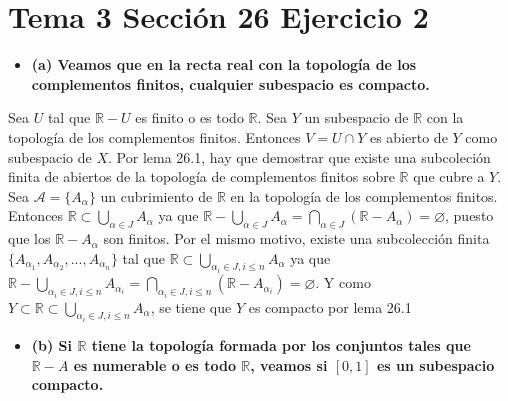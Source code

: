\documentclass{article}
\begin{document}
\section{Tema 3 Sección 26 Ejercicio 2}
\begin{itemize}
\item \bf (a) \rm Veamos que en la recta real con la topología de  los complementos finitos,  cualquier subespacio es compacto.
\end{itemize}
Sea $U$ tal que $\mathbb{R}-U$ es finito o es todo $\mathbb{R}$. Sea $Y$ un subespacio de $\mathbb{R}$ con la topología de los complementos finitos. Entonces $V=U\cap Y$ es abierto de $Y$ como subespacio de $X$. Por lema 26.1, hay que demostrar que existe una subcoleción finita de abiertos de la topología de complementos finitos sobre $\mathbb{R}$ que cubre a $Y$. Sea $\mathcal{A}=\{A_\alpha\}$ un cubrimiento de $\mathbb{R}$ en la topología de los complementos finitos. Entonces $\mathbb{R}\subset\bigcup_{\alpha\in J} A_\alpha$ ya que $\mathbb{R}-\bigcup_{\alpha\in J}A_\alpha=\bigcap_{\alpha\in J}\left(\mathbb{R}-A_\alpha\right)=\varnothing$, puesto que los $\mathbb{R}-A_\alpha$ son finitos. Por el mismo motivo, existe una subcolección finita $\{A_{\alpha_1},A_{\alpha_2},...,A_{\alpha_n}\}$ tal que $\mathbb{R}\subset\bigcup_{\alpha_i\in J,i\leq n} A_\alpha$ ya que $\mathbb{R}-\bigcup_{\alpha_i\in J,i\leq n}A_{\alpha_i}=\bigcap_{\alpha_i\in J,i\leq n}\left(\mathbb{R}-A_{\alpha_i}\right)=\varnothing$. Y como $Y\subset \mathbb{R}\subset\bigcup_{\alpha_i\in J,i\leq n} A_\alpha$, se tiene que $Y$ es compacto por lema 26.1
\begin{itemize}
\item \bf (b) \rm Si $\mathbb{R}$ tiene la topología formada por los conjuntos tales que $\mathbb{R}-A$ es numerable o es todo $\mathbb{R}$, veamos si $[0,1]$ es un subespacio compacto.
\end{itemize}
\end{document}
